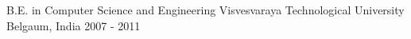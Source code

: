 

\begin{cventries}

  \cventry
    {B.E. in Computer Science and Engineering} %
    {Visvesvaraya Technological University} %
    {Belgaum, India} %
    {2007 - 2011} %
    {}

\end{cventries}
